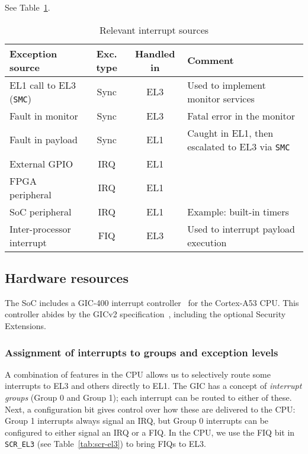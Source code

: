 See Table~\ref{tab:int-sources}.

\begin{table}[b]
  \centering
  \begin{tabular}{lccp{6.2cm}}\toprule
  \textbf{Exception source} & \textbf{Exc. type} & \textbf{Handled in} & \textbf{Comment} \\\midrule
  EL1 call to EL3 (\texttt{SMC}) & Sync & EL3 & Used to implement monitor services \\
  Fault in monitor & Sync & EL3 & Fatal error in the monitor \\
  Fault in payload & Sync & EL1 & Caught in EL1, then escalated to EL3 via \texttt{SMC} \\
  External GPIO & IRQ & EL1 \\
  FPGA peripheral & IRQ & EL1 \\
  SoC peripheral & IRQ & EL1 & Example: built-in timers \\
  Inter-processor interrupt & FIQ & EL3 & Used to interrupt payload execution \\\bottomrule
  \end{tabular}

  \caption{Relevant interrupt sources}
  \label{tab:int-sources}
\end{table}

\subsection{Hardware resources}

The SoC includes a GIC-400 interrupt controller~\cite{gic-400-trm} for the Cortex-A53 CPU.
This controller abides by the GICv2 specification~\cite{gic2-spec}, including the optional Security Extensions.

\subsubsection{Assignment of interrupts to groups and exception levels}
\label{subsect:interrupt-groups}

A combination of features in the CPU allows us to selectively route some interrupts to EL3 and others directly to EL1.
The GIC has a concept of \textit{interrupt groups} (Group 0 and Group 1); each interrupt can be routed to either of these.
Next, a configuration bit gives control over how these are delivered to the CPU:
Group 1 interrupts always signal an IRQ, but Group 0 interrupts can be configured to either signal an IRQ or a FIQ.
In the CPU, we use the FIQ bit in \texttt{SCR\_EL3} (see Table~\ref{tab:scr-el3}) to bring FIQs to EL3.

